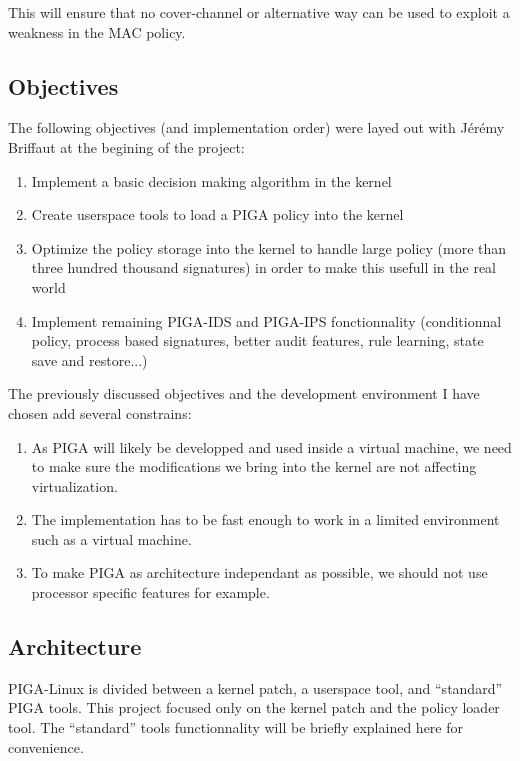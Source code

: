 \documentclass[pdftex,a4paper,titlepage,11pt]{article}
\begin{document}
\bigskip

This will ensure that no cover-channel or alternative way can be used to exploit a weakness in the MAC policy.

\subsection{Objectives}

The following objectives (and implementation order) were layed out with Jérémy Briffaut at the begining of the project:

\begin{enumerate}
	\item Implement a basic decision making algorithm in the kernel
	\item Create userspace tools to load a PIGA policy into the kernel
	\item Optimize the policy storage into the kernel to handle large policy (more than three hundred thousand signatures) in order to make this usefull in the real world
	\item Implement remaining PIGA-IDS and PIGA-IPS fonctionnality (conditionnal policy, process based signatures, better audit features, rule learning, state save and restore...)
\end{enumerate}

\smallskip

The previously discussed objectives and the development environment I have chosen add several constrains:

\begin{enumerate}
	\item As PIGA will likely be developped and used inside a virtual machine, we need to make sure the modifications we bring into the kernel are not affecting virtualization.
	\item The implementation has to be fast enough to work in a limited environment such as a virtual machine.
	\item To make PIGA as architecture independant as possible, we should not use processor specific features for example.
\end{enumerate}


\subsection{Architecture}

PIGA-Linux is divided between a kernel patch, a userspace tool, and ``standard'' PIGA tools. This project focused only on the kernel patch and the policy loader tool. The ``standard'' tools functionnality will be briefly explained here for convenience.
\end{document}
